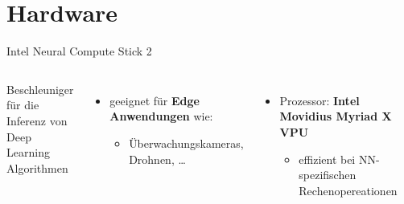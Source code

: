 \section[\thesection \  Hardware]{Hardware}\label{sec:hardware}

\begin{frame}{Intel Neural Compute Stick 2}
    \begin{columns}[T]
        Beschleuniger für die Inferenz von Deep Learning Algorithmen
        \vspace{0.3cm}
        \begin{itemize}
            \item geeignet für \textbf{Edge Anwendungen} wie:
            \begin{itemize}
                \item Überwachungskameras, Drohnen, \dots
            \end{itemize}
            \end{itemize}
            \begin{itemize}
                
            
            \item Prozessor: \textbf{Intel Movidius Myriad X VPU}
            \begin{itemize}
                \item effizient bei NN-spezifischen Rechenopereationen
            \end{itemize}
            
        \end{itemize}
        \vspace{1cm}
        \includegraphics[width=0.8\textwidth]{Bilder/ncs2.jpg}
    \end{columns}
    \vspace{0.3cm}

\end{frame}

